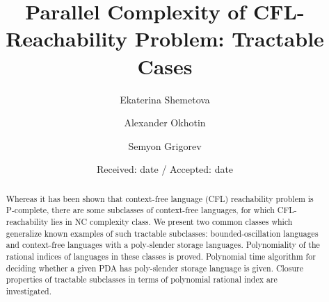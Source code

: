 \documentclass[smallextended]{svjour3}       %
\begin{document}
\title{Parallel Complexity of CFL-Reachability Problem: Tractable Cases%
}


\author{Ekaterina Shemetova         \and
         Alexander Okhotin
         \and Semyon Grigorev %
}



\date{Received: date / Accepted: date}


\maketitle

\begin{abstract}
Whereas it has been shown that  context-free language (CFL) reachability problem is P-complete, there are some subclasses of context-free languages, for which CFL-reachability lies in NC complexity class. We present two common classes which generalize known examples of such tractable subclasses: bounded-oscillation languages and context-free languages with a poly-slender storage languages. Polynomiality of the rational indices of languages in these classes is proved. Polynomial time algorithm for deciding whether a given PDA has poly-slender storage language is given. Closure properties of tractable subclasses in terms of polynomial rational index are investigated. 




\end{abstract}
\end{document}
